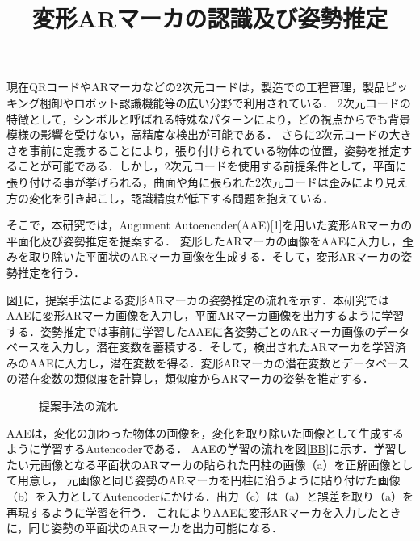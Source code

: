 \documentclass{jsarticle}
\title{変形ARマーカの認識及び姿勢推定}
\begin{document}
\maketitle

現在QRコードやARマーカなどの2次元コードは，製造での工程管理，製品ピッキング棚卸やロボット認識機能等の広い分野で利用されている．
2次元コードの特徴として，シンボルと呼ばれる特殊なパターンにより，どの視点からでも背景模様の影響を受けない，高精度な検出が可能である．
さらに2次元コードの大きさを事前に定義することにより，張り付けられている物体の位置，姿勢を推定することが可能である．しかし，2次元コードを使用する前提条件として，平面に張り付ける事が挙げられる，曲面や角に張られた2次元コードは歪みにより見え方の変化を引き起こし，認識精度が低下する問題を抱えている．

そこで，本研究では，Augument Autoencoder(AAE)[1]を用いた変形ARマーカの平面化及び姿勢推定を提案する．
変形したARマーカの画像をAAEに入力し，歪みを取り除いた平面状のARマーカ画像を生成する．そして，変形ARマーカの姿勢推定を行う．


図\ref{flow}に，提案手法による変形ARマーカの姿勢推定の流れを示す．本研究ではAAEに変形ARマーカ画像を入力し，平面ARマーカ画像を出力するように学習する．姿勢推定では事前に学習したAAEに各姿勢ごとのARマーカ画像のデータベースを入力し，潜在変数を蓄積する．そして，検出されたARマーカを学習済みのAAEに入力し，潜在変数を得る．変形ARマーカの潜在変数とデータベースの潜在変数の類似度を計算し，類似度からARマーカの姿勢を推定する．

\begin{figure}[ht]
\vspace{-5zh}
\setlength{\epsfxsize}{3cm}
\centerline{}
\vspace{8zh}
\caption{提案手法の流れ}
\label{flow}
\vspace{-1.0zh}
\end{figure}

AAEは，変化の加わった物体の画像を，変化を取り除いた画像として生成するように学習するAutencoderである．
AAEの学習の流れを図\ref{BB}に示す．学習したい元画像となる平面状のARマーカの貼られた円柱の画像（a）を正解画像として用意し，
元画像と同じ姿勢のARマーカを円柱に沿うように貼り付けた画像（b）を入力としてAutencoderにかける．出力（c）は（a）と誤差を取り（a）を再現するように学習を行う．
これによりAAEに変形ARマーカを入力したときに，同じ姿勢の平面状のARマーカを出力可能になる．
\end{document}
